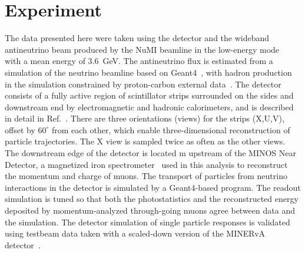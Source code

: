 
\section{Experiment}

The data presented here were taken using the \minerva detector and the wideband antineutrino beam produced by the NuMI beamline
in the low-energy mode~\cite{Anderson:1998zza} with a mean energy of $3.6$~GeV.
The antineutrino flux is estimated from a simulation of the neutrino beamline based on Geant4~\cite{Agostinelli2003250,1610988}, with
hadron production in the simulation constrained by proton-carbon external data~\cite{Alt:2006fr,Barton:1982dg,Lebedev:2007zz}.
The \minerva detector consists of a fully active region of scintillator strips surrounded on the sides 
and downstream end by electromagnetic and hadronic calorimeters, and is described in detail in Ref.~\cite{minerva_nim}.
There are three orientations (views) for the strips (X,U,V), offset by $60^\circ$ from each other, which enable 
three-dimensional reconstruction of particle trajectories.
The X view is sampled twice as often as the other views.
The downstream edge of the \minerva detector is located \unit[2]{m} upstream of the MINOS Near Detector, 
a magnetized iron spectrometer~\cite{Michael:2008bc} used in this analysis 
to reconstruct the momentum and charge of muons.
The transport of particles from neutrino interactions in the detector is simulated by a Geant4-based program.
The readout simulation is tuned so that both the photostatistics and the reconstructed energy deposited
by momentum-analyzed through-going muons agree between data and the simulation. The detector 
simulation of single particle responses is validated using testbeam data taken with a scaled-down 
version of the MINERvA detector~\cite{Aliaga:2015aqe}.

